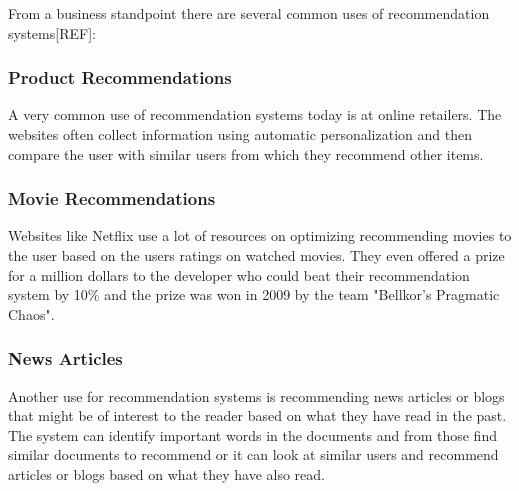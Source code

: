 From a business standpoint there are several common uses of recommendation systems[REF]:

\subsubsection{Product Recommendations}

A very common use of recommendation systems today is at online retailers. The websites often collect information using automatic personalization and then compare the user with similar users from which they recommend other items.

\subsubsection{Movie Recommendations}

Websites like Netflix use a lot of resources on optimizing recommending movies to the user based on the users ratings on watched movies. They even offered a prize for a million dollars to the developer who could beat their recommendation system by 10\% and the prize was won in 2009 by the team "Bellkor's Pragmatic Chaos".

\subsubsection{News Articles}

Another use for recommendation systems is recommending news articles or blogs that might be of interest to the reader based on what they have read in the past. The system can identify important words in the documents and from those find similar documents to recommend or it can look at similar users and recommend articles or blogs based on what they have also read. 